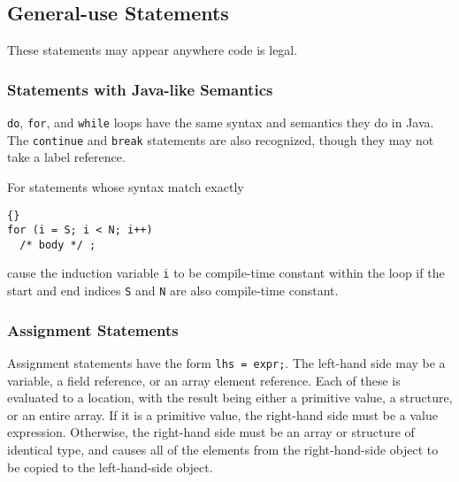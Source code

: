 \documentclass[11pt]{article}
\begin{document}


\subsection{General-use Statements}

These statements may appear anywhere code is legal.

\subsubsection{Statements with Java-like Semantics}

\lstinline|do|, \lstinline|for|, and \lstinline|while| loops have the same
syntax and semantics they do in Java.  The \lstinline|continue| and
\lstinline|break| statements are also recognized, though they may not
take  a label reference.

For statements whose syntax match exactly

\begin{lstlisting}{}
for (i = S; i < N; i++)
  /* body */ ;
\end{lstlisting}

\noindent
cause the induction variable \lstinline|i| to be compile-time constant
within the loop if the start and end indices \lstinline|S| and \lstinline|N| are
also compile-time constant.

\subsubsection{Assignment Statements}

Assignment statements have the form \lstinline|lhs = expr;|.  The left-hand
side may be a variable, a field reference, or an array element
reference.  Each of these is evaluated to a location, with the result
being either a primitive value, a structure, or an entire array.  If
it is a primitive value, the right-hand side must be a value
expression.  Otherwise, the right-hand side must be an array or
structure of identical type, and causes all of the elements from the
right-hand-side object to be copied to the left-hand-side object.
\end{document}
